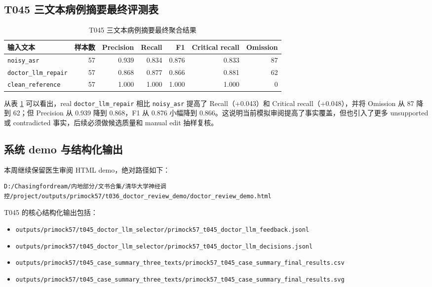 \documentclass[UTF8,a4paper,12pt]{ctexart}
\newcommand{\code}[1]{\texttt{#1}}
\begin{document}
\subsection{T045 三文本病例摘要最终评测表}

\begin{table}[H]
\centering
\caption{T045 三文本病例摘要最终聚合结果}
\label{tab:t045-final}
\small
\begin{tabular}{lrrrrrr}
\toprule
输入文本 & 样本数 & Precision & Recall & F1 & Critical recall & Omission \\
\midrule
\code{noisy\_asr} & 57 & 0.939 & 0.834 & 0.876 & 0.833 & 87 \\
\code{doctor\_llm\_repair} & 57 & 0.868 & 0.877 & 0.866 & 0.881 & 62 \\
\code{clean\_reference} & 57 & 1.000 & 1.000 & 1.000 & 1.000 & 0 \\
\bottomrule
\end{tabular}
\end{table}

从表 \ref{tab:t045-final} 可以看出，real \code{doctor\_llm\_repair} 相比 \code{noisy\_asr} 提高了 Recall（+0.043）和 Critical recall（+0.048），并将 Omission 从 87 降到 62；但 Precision 从 0.939 降到 0.868，F1 从 0.876 小幅降到 0.866。这说明当前模拟审阅提高了事实覆盖，但也引入了更多 unsupported 或 contradicted 事实，后续必须做候选质量和 manual edit 抽样复核。

\subsection{系统 demo 与结构化输出}

本周继续保留医生审阅 HTML demo，绝对路径如下：

\begin{verbatim}
D:/Chasingfordream/内地部分/文书合集/清华大学神经调控/project/outputs/primock57/t036_doctor_review_demo/doctor_review_demo.html
\end{verbatim}

T045 的核心结构化输出包括：

\begin{itemize}
  \item \code{outputs/primock57/t045\_doctor\_llm\_selector/primock57\_t045\_doctor\_llm\_feedback.jsonl}
  \item \code{outputs/primock57/t045\_doctor\_llm\_selector/primock57\_t045\_doctor\_llm\_decisions.jsonl}
  \item \code{outputs/primock57/t045\_case\_summary\_three\_texts/primock57\_t045\_case\_summary\_final\_results.csv}
  \item \code{outputs/primock57/t045\_case\_summary\_three\_texts/primock57\_t045\_case\_summary\_final\_results.svg}
\end{itemize}
\end{document}
